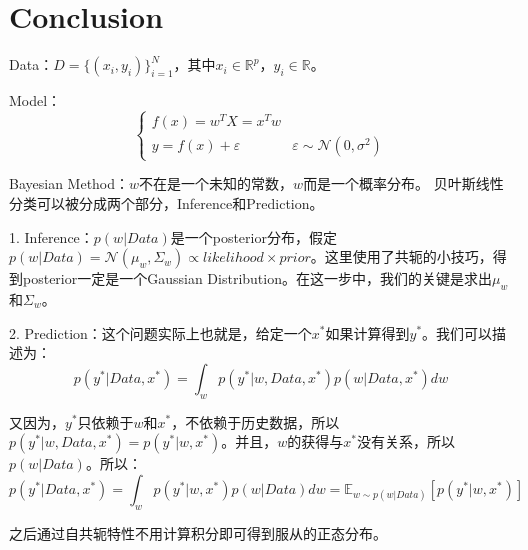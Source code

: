 \documentclass[a4paper]{article}
\begin{document}
\section{Conclusion}
Data：$D=\{(x_i,y_i)\}^{N}_{i=1}$，其中$x_i\in\mathbb{R}^{p}$，$y_i\in\mathbb{R}$。

Model：
\begin{equation}
\left\{
\begin{array}{ll}
      f(x)=w^TX = x^Tw & \\
      y = f(x) + \varepsilon & \varepsilon \sim \mathcal{N}(0,\sigma^2)
\end{array}
\right.    
\end{equation}

Bayesian Method：$w$不在是一个未知的常数，$w$而是一个概率分布。
贝叶斯线性分类可以被分成两个部分，Inference和Prediction。

1. Inference：$p(w|Data)$是一个posterior分布，假定$p(w|Data)=\mathcal{N}(\mu_w, \Sigma_w) \propto likelihood \times prior$。这里使用了共轭的小技巧，得到posterior一定是一个Gaussian Distribution。在这一步中，我们的关键是求出$\mu_w$和$\Sigma_w$。

2. Prediction：这个问题实际上也就是，给定一个$x^\ast$如果计算得到$y^\ast$。我们可以描述为：
\begin{equation}
    p(y^\ast|Data,x^\ast) = \int_w p(y^\ast|w,Data,x^\ast)p(w|Data,x^\ast) dw 
\end{equation}

又因为，$y^\ast$只依赖于$w$和$x^\ast$，不依赖于历史数据，所以$p(y^\ast|w,Data,x^\ast)=p(y^\ast|w,x^\ast)$。并且，$w$的获得与$x^\ast$没有关系，所以$p(w|Data)$。所以：
\begin{equation}
    p(y^\ast|Data,x^\ast) = \int_w p(y^\ast|w,x^\ast)p(w|Data) dw = \mathbb{E}_{w\sim p(w|Data)}[p(y^\ast|w,x^\ast)] 
\end{equation}

之后通过自共轭特性不用计算积分即可得到服从的正态分布。
\end{document}
